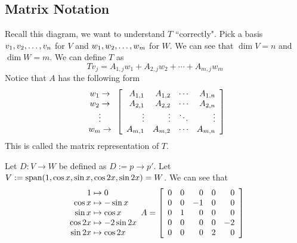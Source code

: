 \subsection{Matrix Notation}
\begin{center}
\end{center}
Recall this diagram, we want to understand $T$ ``correctly". Pick a basis ${v}_1,{v}_2, \ldots, {v}_{n}$ for $V$ and ${w}_1,{w}_2, \ldots, {w}_{m}$ for $W$. We can see that $\dim V = n$ and $\dim W = m$. We can define $T$ as
\[Tv_j = A_{1,j} w_1 + A_{2,j} w_2 + \cdots + A_{m,j} w_m \]
Notice that $A$ has the following form
\[ \begin{array}{cc}
     w_1 \to \\
     w_2 \to \\
     \vdots \\
     w_m \to
\end{array}\left[\begin{array}{rrrrr} A_{1,1} & A_{1,2} & \cdots & A_{1,n} \\ 
A_{2,1} & A_{2,2} & \cdots & A_{2,n} \\
\vdots & \vdots & \ddots & \vdots \\ 
A_{m,1} & A_{m,2} & \cdots & A_{m,n} \end{array} \right]\]
This is called the matrix representation of $T$.
\begin{example}
    Let $D: V \to W$ be defined as $D := p \to p'$. Let $V:= \text{span} (1, \cos x, \sin x, \cos 2x, \sin 2x) = W$. We can see that 
    \[\begin{array}{rl}
         1 &\hspace{-0.25cm}\mapsto 0 \\ \cos x &\hspace{-0.25cm}\mapsto -\sin x \\ \sin x &\hspace{-0.25cm}\mapsto \cos x \\ \cos 2x &\hspace{-0.25cm}\mapsto -2 \sin 2x \\ \sin 2x &\hspace{-0.25cm}\mapsto \cos 2x
    \end{array} A = \bml 0 & 0 & 0 & 0 & 0 \\ 
               0 & 0 & -1 & 0 & 0 \\
               0 & 1 & 0 & 0 & 0 \\
               0 & 0 & 0 & 0 & -2 \\
               0 & 0 & 0 & 2 & 0 \bmr\]
\end{example}
